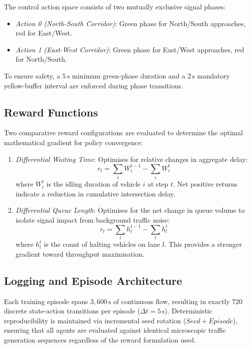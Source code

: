 \documentclass[12pt]{article}
\begin{document}
The control action space consists of two mutually exclusive signal phases:
\begin{itemize}
	\item \emph{Action 0 (North-South Corridor)}: Green phase for North/South approaches, red for East/West.
	\item \emph{Action 1 (East-West Corridor)}: Green phase for East/West approaches, red for North/South.
\end{itemize}
To ensure safety, a \( 5\,\text{s} \) minimum green-phase duration and a \( 2\,\text{s} \) mandatory yellow-buffer interval are enforced during phase transitions.

\subsection{Reward Functions}
Two comparative reward configurations are evaluated to determine the optimal mathematical gradient for policy convergence:

\begin{enumerate}
	\item \emph{Differential Waiting Time}: Optimises for relative changes in aggregate delay:
	\begin{equation}
		r_t = \sum_{i} W_i^{t-1} - \sum_{i} W_i^{t}
	\end{equation}
	where \( W_i^t \) is the idling duration of vehicle \( i \) at step \( t \). Net positive returns indicate a reduction in cumulative intersection delay.
	
	\item \emph{Differential Queue Length}: Optimises for the net change in queue volume to isolate signal impact from background traffic noise:
	\begin{equation}
		r_t = \sum_{l} h_l^{t-1} - \sum_{l} h_l^t
	\end{equation}
	where \( h_l^t \) is the count of halting vehicles on lane \( l \). This provides a stronger gradient toward throughput maximisation.
\end{enumerate}

\subsection{Logging and Episode Architecture}
Each training episode spans \( 3{,}600\,\text{s} \) of continuous flow, resulting in exactly \( 720 \) discrete state-action transitions per episode (\( \Delta t = 5\,\text{s} \)). Deterministic reproducibility is maintained via incremental seed rotation (\( Seed + Episode \)), ensuring that all agents are evaluated against identical microscopic traffic generation sequences regardless of the reward formulation used.
\end{document}
